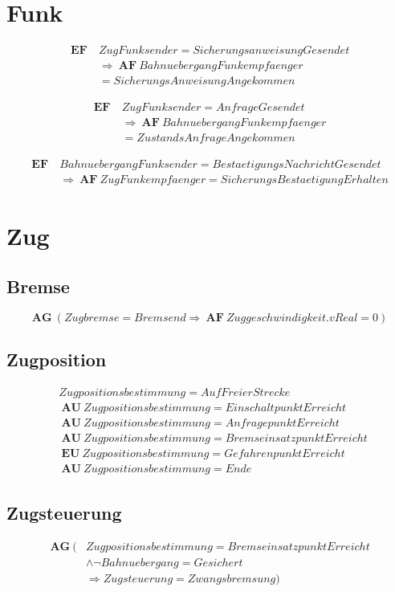 \documentclass[12pt,a4paper,draft]{article}
\newcommand{\AF}{\ \textbf{AF}\ }
\newcommand{\AG}{\ \textbf{AG}\ }
\newcommand{\AU}{\ \textbf{AU}\ }
\newcommand{\EF}{\ \textbf{EF}\ }
\newcommand{\EU}{\ \textbf{EU}\ }
\newcommand{\myeq}[1]{%
\begin{equation}
\begin{split}
#1
\end{split}
\end{equation}
}
\begin{document}
\section{Funk}
\myeq{
\EF &ZugFunksender = SicherungsanweisungGesendet \\
	&\Rightarrow \AF BahnuebergangFunkempfaenger \\
    &= SicherungsAnweisungAngekommen
}
\myeq{
\EF &ZugFunksender = AnfrageGesendet \\
	&\Rightarrow \AF BahnuebergangFunkempfaenger \\
    &= ZustandsAnfrageAngekommen
}
\myeq{
\EF &BahnuebergangFunksender = BestaetigungsNachrichtGesendet \\
	&\Rightarrow \AF ZugFunkempfaenger = SicherungsBestaetigungErhalten 
}


\section{Zug}
\subsection{Bremse}
\begin{equation}
\AG (Zugbremse = Bremsend \Rightarrow \AF Zuggeschwindigkeit.vReal = 0)
\end{equation}

\subsection{Zugposition}
\myeq{
&Zugpositionsbestimmung = AufFreierStrecke \\
&\AU Zugpositionsbestimmung = EinschaltpunktErreicht \\
&\AU Zugpositionsbestimmung = AnfragepunktErreicht \\
&\AU Zugpositionsbestimmung = BremseinsatzpunktErreicht \\
&\EU Zugpositionsbestimmung = GefahrenpunktErreicht \\ %
&\AU Zugpositionsbestimmung = Ende
}

\subsection{Zugsteuerung}
\myeq{
\AG (&Zugpositionsbestimmung = BremseinsatzpunktErreicht \\
	& \land \neg Bahnuebergang = Gesichert \\
    & \Rightarrow Zugsteuerung = Zwangsbremsung)
}
\end{document}

